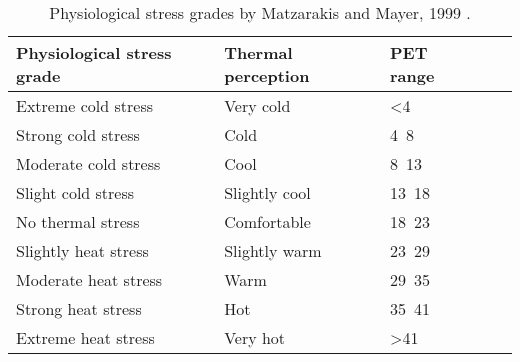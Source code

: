 \begin{table}[htbp]
\begin{adjustwidth}{0in}{0in} %
\centering
\begin{tabular}{lllrr}
\toprule
Physiological stress grade &       Thermal perception &  PET range \\
\midrule
Extreme cold stress &      Very cold &           <4 \\
Strong cold stress &           Cold &           4~8 \\
Moderate cold stress &           Cool &           8~13 \\
Slight cold stress &  Slightly cool &          13~18 \\
No thermal stress &    Comfortable &          18~23 \\
Slightly heat stress &  Slightly warm &          23~29 \\
Moderate heat stress &           Warm &          29~35 \\
Strong heat stress &            Hot &          35~41 \\
Extreme heat stress &       Very hot &          >41 \\
\bottomrule
\end{tabular}
\caption[Physiological stress grades] {Physiological stress grades by Matzarakis and Mayer, 1999 \cite{matzarakis_applications_1999}.}
\label{table:stress_temp}
\end{adjustwidth}
\end{table}

